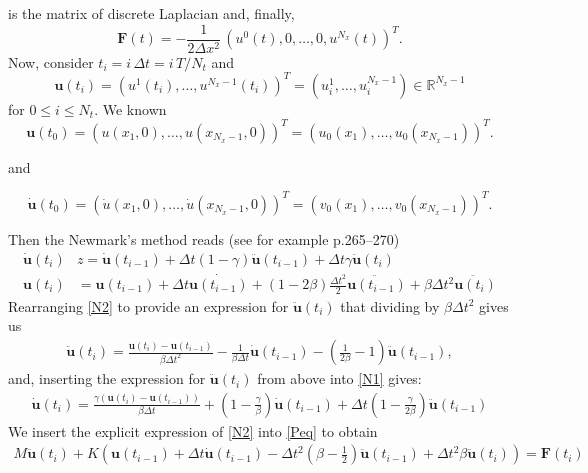 \documentclass[a4paper, 10pt]{article}
\begin{document}
is the matrix of discrete Laplacian and, finally,
$$
\mathbf{F}(t) = -\frac{1}{2\Delta x^2}\,(u^0(t),0,\ldots,0,u^{N_x}(t))^T.
$$
Now, consider $t_i = i \,\Delta t = i \, T/N_t$ and 
$$
\mathbf{u}(t_i) = (u^1(t_i),\ldots,u^{N_x-1}(t_i))^T = (u^1_i,\ldots,u^{N_x-1}_i) \in \mathbb{R}^{N_x-1}
$$
for $0 \le i \le N_t.$ We known
$$
\mathbf{u}(t_0) = (u(x_1,0),\ldots,u(x_{N_x-1},0))^T = (u_0(x_1),\ldots,u_0(x_{N_x-1}))^T.
$$

and

$$
\dot{\mathbf{u}}(t_0) = (\dot{u}(x_1,0),\ldots,\dot{u}(x_{N_x-1},0))^T = (v_0(x_1),\ldots,v_0(x_{N_x-1}))^T.
$$

Then the Newmark's method reads (see for example \cite{LP2019} p.265--270)
\begin{align}
\dot{\mathbf{u}}(t_i) &z = \dot{\mathbf{u}}(t_{i-1}) + \Delta t (1-\gamma) \ddot{\mathbf{u}}(t_{i-1}) + \Delta t \gamma  \ddot{\mathbf{u}}(t_{i}) \label{N1}\\
\mathbf{u}(t_i) & = \mathbf{u}(t_{i-1})+\Delta t  \dot{\mathbf{u}(t_{i-1})}
+(1-2\beta)\frac{\Delta t^2}{2} \ddot{\mathbf{u}(t_{i-1})}+\beta \Delta t^2  \ddot{\mathbf{u}(t_{i})} \label{N2}
\end{align}
Rearranging \eqref{N2} to provide an expression for $ \ddot{\mathbf{u}}(t_{i})$ that dividing by $\beta \Delta t^2$ gives us
\begin{align}
\ddot{\mathbf{u}}(t_{i}) = \frac{\mathbf{u}(t_{i})-\mathbf{u}(t_{i-1})}{\beta \Delta t^2} - \frac{1}{\beta \Delta t} \dot{\mathbf{u}}(t_{i-1})
-\left( \frac{1}{2\beta}-1\right)\ddot{\mathbf{u}}(t_{i-1}), \label{ddot1}
\end{align}
and, inserting the expression for $\ddot{\mathbf{u}}(t_{i})$ from above into \eqref{N1} gives:
\begin{align}
\dot{\mathbf{u}}(t_{i}) = \frac{\gamma(\mathbf{u}(t_{i})-\mathbf{u}(t_{i-1}))}{\beta \Delta t} + \left( 1 - \frac{\gamma}{\beta }\right)  \dot{\mathbf{u}}(t_{i-1})
+\Delta t \left( 1-\frac{\gamma}{2\beta}\right)\ddot{\mathbf{u}}(t_{i-1}) \label{dot1}
\end{align}
We insert the explicit expression of \eqref{N2} into \eqref{Peq} to obtain
\begin{align}
 M \ddot{\mathbf{u}}(t_{i})  + K \left(\mathbf{u}(t_{i-1}) + \Delta t \dot{\mathbf{u}}(t_{i-1})
- \Delta t^2 \left( \beta -\frac{1}{2}\right)\ddot{\mathbf{u}}(t_{i-1}) + \Delta t^2 \beta \ddot{\mathbf{u}}(t_{i}) \right)   = \mathbf{F}(t_{i})\label{newmark}
\end{align}
\end{document}
